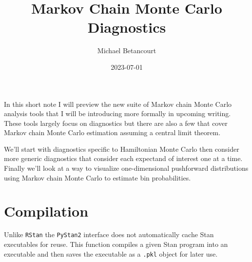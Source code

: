 \documentclass[
  letterpaper,
  DIV=11,
  numbers=noendperiod]{scrartcl}
\title{Markov Chain Monte Carlo Diagnostics}
\author{Michael Betancourt}
\date{2023-07-01}
\renewcommand*\contentsname{Table of contents}
\newcommand\contentsname{Table of contents}
\begin{document}
\maketitle
\ifdefined\Shaded\renewenvironment{Shaded}{\begin{tcolorbox}[breakable, frame hidden, enhanced, sharp corners, borderline west={3pt}{0pt}{shadecolor}, interior hidden, boxrule=0pt]}{\end{tcolorbox}}\fi

\renewcommand*\contentsname{Table of contents}
{
\hypersetup{linkcolor=}
\setcounter{tocdepth}{3}
\tableofcontents
}
In this short note I will preview the new suite of Markov chain Monte
Carlo analysis tools that I will be introducing more formally in
upcoming writing. These tools largely focus on diagnostics but there are
also a few that cover Markov chain Monte Carlo estimation assuming a
central limit theorem.

We'll start with diagnostics specific to Hamiltonian Monte Carlo then
consider more generic diagnostics that consider each expectand of
interest one at a time. Finally we'll look at a way to visualize
one-dimensional pushforward distributions using Markov chain Monte Carlo
to estimate bin probabilities.

\hypertarget{compilation}{%
\section{Compilation}\label{compilation}}

Unlike \texttt{RStan} the \texttt{PyStan2} interface does not
automatically cache Stan executables for reuse. This function compiles a
given Stan program into an executable and then saves the executable as a
\texttt{.pkl} object for later use.
\end{document}
